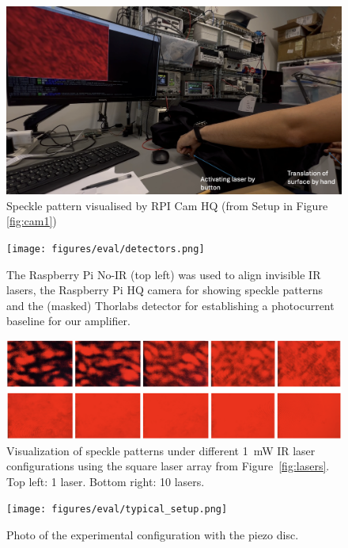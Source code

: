 \begin{figure}[t]
\centering
\includegraphics[width=\textwidth]{figures/impl/camera_setup2.png}
\caption{Speckle pattern visualised by RPI Cam HQ (from Setup in Figure \ref{fig:cam1})}
\label{fig:cam2}
\end{figure}

\begin{figure}[t]
\centering
\texttt{[image: figures/eval/detectors.png]}
\caption{The Raspberry Pi No-IR (top left) was used to align invisible IR lasers, the Raspberry Pi HQ camera for 
showing speckle patterns and the (masked) Thorlabs detector for establishing a photocurrent baseline for our amplifier.}
\label{fig:detectors}
\end{figure}

\begin{figure}[t]
\centering
\includegraphics[width=\textwidth]{figures/eval/speckles}
\caption{Visualization of speckle patterns under different 1~mW IR laser configurations using the square 
laser array from Figure~\ref{fig:lasers}. Top left: 1 laser. Bottom right: 10 lasers.}
\label{fig:speckles}
\end{figure}

\begin{figure}[t]
\centering
\texttt{[image: figures/eval/typical\_setup.png]}
\caption{Photo of the experimental configuration with the piezo disc.}
\label{fig:setup}
\end{figure}

